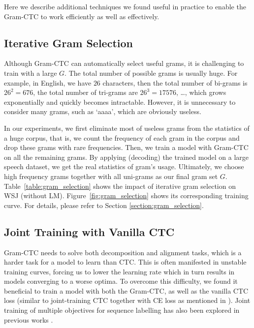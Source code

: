 \documentclass{article}
\begin{document}
Here we describe additional techniques we found useful in practice to enable the Gram-CTC to work efficiently as well as effectively.


\subsection{Iterative Gram Selection}

Although Gram-CTC can automatically select useful grams, it is challenging to train with a large $G$. The total number of possible grams is usually huge. For example, in English, we have $26$ characters, then the total number of bi-grams is $26^2=676$, the total number of tri-grams are $26^3=17576$, \ldots, which grows exponentially and quickly becomes intractable. However, it is unnecessary to consider many grams, such as `aaaa', which are obviously useless.

In our experiments, we first eliminate most of useless grams from the statistics of a huge corpus, that is, we count the frequency of each gram in the corpus and drop these grams with rare frequencies. Then, we train a model with Gram-CTC on all the remaining grams. By applying (decoding) the trained model on a large speech dataset, we get the real statistics of gram's usage. Ultimately, we choose high frequency grams together with all uni-grams as our final gram set $G$.
Table~\ref{table:gram_selection} shows the impact of iterative gram selection on WSJ (without LM). Figure~\ref{fig:gram_selection} shows its corresponding training curve. For details, please refer to Section \ref{section:gram_selection}.


\subsection{Joint Training with Vanilla CTC}

Gram-CTC needs to solve both decomposition and alignment tasks, which is a harder task for a model to learn than CTC. This is often manifested in unstable training curves, forcing us to lower the learning rate which in turn results in models converging to a worse optima. To overcome this difficulty, we found it beneficial to train a model with both the Gram-CTC, as well as the vanilla CTC loss (similar to joint-training CTC together with CE loss as mentioned in \cite{Sak2015FastAA}). Joint training of multiple objectives for sequence labelling has also been explored in previous works \cite{kim2016joint, kim2016sequence}. 
\end{document}

